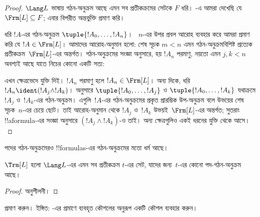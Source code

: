 \documentclass[../../../include/open-logic-section]{subfiles}
\begin{document}
\begin{proof}
$\Lang L$ ভাষায় গঠন-অনুক্রম আছে এমন সব প্রতীকক্রমের সেটকে $F$ ধরি।
-এ আমরা দেখেছি যে
$\Frm[L] \subseteq F$; এবার বিপরীত অন্তর্ভুক্তি প্রমাণ করি।

ধরি $!A$-এর গঠন-অনুক্রম $\tuple{!A_0,\dotsc,!A_n}$।
~$n$-এর উপর প্রবল আরোহ ব্যবহার করে আমরা প্রমাণ করি যে
$!A \in \Frm[L]$। আমাদের আরোহ-অনুমান হলো: শেষ সূচক $m < n$ এমন
গঠন-অনুক্রমবিশিষ্ট প্রত্যেক প্রতীকক্রম~$\Frm[L]$-এর অন্তর্গত।
গঠন-অনুক্রমের সংজ্ঞা অনুসারে, হয় $!A_n$ পরমাণু, নয়তো এমন $j,k < n$
অবশ্যই আছে যাতে নিচের কোনো একটি সত্য:
\begin{enumerate}
\end{enumerate}
এখন ক্ষেত্রভেদে যুক্তি দিই। $!A_n$ পরমাণু হলে
$!A_n \in \Frm[L]$। অন্য দিকে, ধরি $!A_n \ident
(!A_j \land !A_k)$।  অনুসারে
$\tuple{!A_0,\dotsc,!A_j}$ ও $\tuple{!A_0,\dotsc,!A_k}$ যথাক্রমে
$!A_j$ ও~$!A_k$-এর গঠন-অনুক্রম। এগুলি~$!A$-এর গঠন-অনুক্রমের প্রকৃত
প্রারম্ভিক উপ-অনুক্রম বলে উভয়ের শেষ সূচক~$n$-এর চেয়ে ছোট। তাই
আরোহ-অনুমান থেকে $!A_j$ ও~$!A_k$ উভয়ই~$\Frm[L]$-এর অন্তর্গত;
সুতরাং !!a{formula}-এর সংজ্ঞা অনুসারে
$(!A_j \land !A_k)$-ও তাই। অন্য ক্ষেত্রগুলিও একই ধরনের যুক্তি থেকে আসে।


\end{proof}

পদের গঠন-অনুক্রমেরও !!{formula}s-এর গঠন-অনুক্রমের মতো ধর্ম আছে।

\begin{prop}
$\Trm[L]$ হলো $\Lang L$-এর এমন সব প্রতীকক্রম $t$-এর সেট,
যাদের জন্য~$t$-এর কোনো পদ-গঠন-অনুক্রম আছে।
\end{prop}

\begin{proof}
অনুশীলনী।
\end{proof}

\begin{prob}
 প্রমাণ করুন।
ইঙ্গিত: -এর প্রমাণে ব্যবহৃত
কৌশলের অনুরূপ একটি কৌশল ব্যবহার করুন।
\end{prob}
\end{document}
